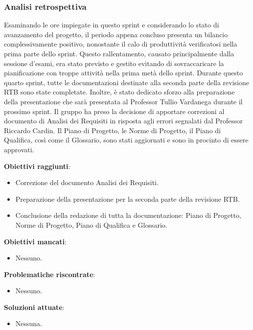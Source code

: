 \subsubsection{Analisi retrospettiva}

Esaminando le ore impiegate in questo sprint e considerando lo stato di avanzamento del progetto, il periodo appena concluso presenta un bilancio complessivamente positivo, 
nonostante il calo di produttività verificatosi nella prima parte dello sprint. Questo rallentamento, causato principalmente dalla sessione d'esami, era stato previsto e gestito evitando 
di sovraccaricare la pianificazione con troppe attività nella prima metà dello sprint.
Durante questo quarto sprint, tutte le documentazioni destinate alla seconda parte della revisione RTB sono state completate. Inoltre, è stato dedicato sforzo alla preparazione della 
presentazione che sarà presentata al Professor Tullio Vardanega durante il prossimo sprint. Il gruppo ha preso la decisione di apportare correzioni al documento di Analisi dei Requisiti in 
risposta agli errori segnalati dal Professor Riccardo Cardin.
Il Piano di Progetto, le Norme di Progetto, il Piano di Qualifica, così come il Glossario, sono stati aggiornati e sono in procinto di essere approvati.

\textbf{Obiettivi raggiunti}:
\begin{itemize}
	\item Correzione del documento Analisi dei Requisiti.
	\item Preparazione della presentazione per la seconda parte della revisione RTB.
	\item Conclusione della redazione di tutta la documentazione: Piano di Progetto, Norme di Progetto, Piano di Qualifica e Glossario.
\end{itemize}

\textbf{Obiettivi mancati}:
\begin{itemize}
	\item Nessuno.
\end{itemize}

\textbf{Problematiche riscontrate}:
\begin{itemize}
	\item Nessuno.
\end{itemize}

\textbf{Soluzioni attuate}:
\begin{itemize}
	\item Nessuna.
\end{itemize}


